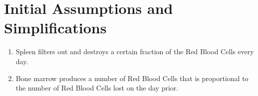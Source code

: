 \section{Initial Assumptions and Simplifications}

\begin{enumerate}
\item Spleen filters out and destroys a certain fraction of the Red Blood Cells every day.
\item Bone marrow produces a number of Red Blood Cells that is proportional to the number of Red Blood Cells lost on the day prior.
\end{enumerate}
